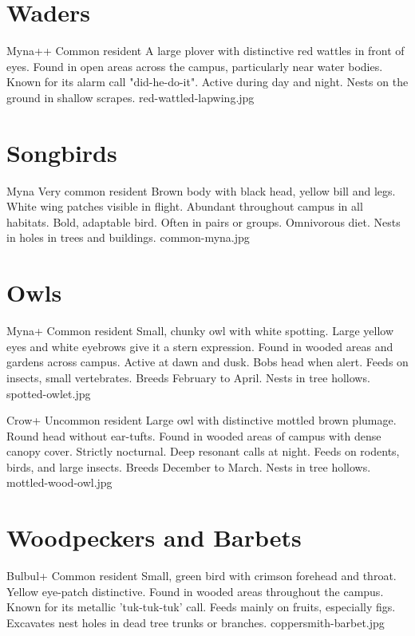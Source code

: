 \documentclass[aspectratio=169]{beamer}
\begin{document}
\section{Waders}
{Myna++}
{Common resident}
{A large plover with distinctive red wattles in front of eyes.}
{Found in open areas across the campus, particularly near water bodies.}
{Known for its alarm call "did-he-do-it". Active during day and night.}
{Nests on the ground in shallow scrapes.}
{red-wattled-lapwing.jpg}

\section{Songbirds}
{Myna}
{Very common resident}
{Brown body with black head, yellow bill and legs. White wing patches visible in flight.}
{Abundant throughout campus in all habitats.}
{Bold, adaptable bird. Often in pairs or groups. Omnivorous diet.}
{Nests in holes in trees and buildings.}
{common-myna.jpg}

\section{Owls}
{Myna+}
{Common resident}
{Small, chunky owl with white spotting. Large yellow eyes and white eyebrows give it a stern expression.}
{Found in wooded areas and gardens across campus.}
{Active at dawn and dusk. Bobs head when alert. Feeds on insects, small vertebrates.}
{Breeds February to April. Nests in tree hollows.}
{spotted-owlet.jpg}

{Crow+}
{Uncommon resident}
{Large owl with distinctive mottled brown plumage. Round head without ear-tufts.}
{Found in wooded areas of campus with dense canopy cover.}
{Strictly nocturnal. Deep resonant calls at night. Feeds on rodents, birds, and large insects.}
{Breeds December to March. Nests in tree hollows.}
{mottled-wood-owl.jpg}

\section{Woodpeckers and Barbets}
{Bulbul+}
{Common resident}
{Small, green bird with crimson forehead and throat. Yellow eye-patch distinctive.}
{Found in wooded areas throughout the campus.}
{Known for its metallic 'tuk-tuk-tuk' call. Feeds mainly on fruits, especially figs.}
{Excavates nest holes in dead tree trunks or branches.}
{coppersmith-barbet.jpg}
\end{document}

